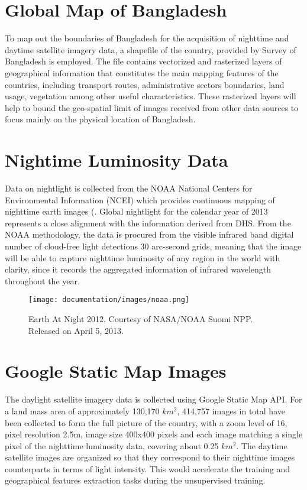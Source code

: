 \documentclass[solid,math,chem,code,plot,gloss]{bmc}
\begin{document}
\section{Global Map of Bangladesh}

To map out the boundaries of Bangladesh for the acquisition of nighttime and daytime satellite imagery data, a shapefile of the country, provided by Survey of Bangladesh is employed. The file contains vectorized and rasterized layers of geographical information that constitutes the main mapping features of the countries, including transport routes, administrative sectors boundaries, land usage, vegetation among other useful characteristics. These rasterized layers will help to bound the geo-spatial limit of images received from other data sources to focus mainly on the physical location of Bangladesh.     

\section{Nightime Luminosity Data}

Data on nightlight is collected from the NOAA National Centers for Environmental Information (NCEI) which provides continuous mapping of nighttime earth images (\cite{noaa}. Global nightlight for the calendar year of 2013 represents a close alignment with the information derived from DHS. From the NOAA methodology, the data is procured from the visible infrared band digital number of cloud-free light detections 30 arc-second grids, meaning that the image will be able to capture nighttime luminosity of any region in the world with clarity, since it records the aggregated information of infrared wavelength throughout the year. 

\begin{figure}
    \centering
    \texttt{[image: documentation/images/noaa.png]}
    \caption{Earth At Night 2012. Courtesy of NASA/NOAA Suomi NPP. Released on April 5, 2013.}
    \label{fig:nasa}
\end{figure}

\section{Google Static Map Images}

The daylight satellite imagery data is collected using Google Static Map API. For a land mass area of approximately 130,170 $km^2$, 414,757 images in total have been collected to form the full picture of the country, with a zoom level of 16, pixel resolution 2.5m, image size 400x400 pixels and each image matching a single pixel of the nighttime luminosity data, covering about 0.25 $km^2$. The daytime satellite images are organized so that they correspond to their nighttime images counterparts in terms of light intensity. This would accelerate the training and geographical features extraction tasks during the unsupervised training. 
\end{document}
